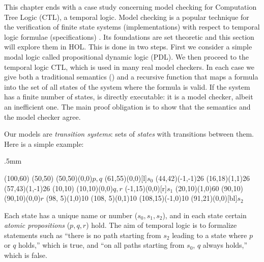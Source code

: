 %
\begin{isabellebody}%
\def\isabellecontext{Base}%
%
\isadelimtheory
%
\endisadelimtheory
%
\isatagtheory
%
\endisatagtheory
{\isafoldtheory}%
%
\isadelimtheory
%
\endisadelimtheory
%
\isamarkuptrue%
%
\begin{isamarkuptext}%
\label{sec:VMC}
This chapter ends with a case study concerning model checking for 
Computation Tree Logic (CTL), a temporal logic.
Model checking is a popular technique for the verification of finite
state systems (implementations) with respect to temporal logic formulae
(specifications) \cite{ClarkeGP-book,Huth-Ryan-book}. Its foundations are set theoretic
and this section will explore them in HOL\@. This is done in two steps.  First
we consider a simple modal logic called propositional dynamic
logic (PDL)\@.  We then proceed to the temporal logic CTL, which is
used in many real
model checkers. In each case we give both a traditional semantics (\isa{{\isasymTurnstile}}) and a
recursive function  that maps a formula into the set of all states of
the system where the formula is valid. If the system has a finite number of
states,  is directly executable: it is a model checker, albeit an
inefficient one. The main proof obligation is to show that the semantics
and the model checker agree.

\underscoreon

Our models are \emph{transition systems}:
sets of \emph{states} with
transitions between them.  Here is a simple example:
\begin{center}
\unitlength.5mm
\thicklines
\begin{picture}(100,60)
\put(50,50){}
\put(50,50){\makebox(0,0){$p,q$}}
\put(61,55){\makebox(0,0)[l]{$s_0$}}
\put(44,42){\vector(-1,-1){26}}
\put(16,18){\vector(1,1){26}}
\put(57,43){\vector(1,-1){26}}
\put(10,10){}
\put(10,10){\makebox(0,0){$q,r$}}
\put(-1,15){\makebox(0,0)[r]{$s_1$}}
\put(20,10){\vector(1,0){60}}
\put(90,10){}
\put(90,10){\makebox(0,0){$r$}}
\put(98, 5){\line(1,0){10}}
\put(108, 5){\line(0,1){10}}
\put(108,15){\vector(-1,0){10}}
\put(91,21){\makebox(0,0)[bl]{$s_2$}}
\end{picture}
\end{center}
Each state has a unique name or number ($s_0,s_1,s_2$), and in each state
certain \emph{atomic propositions} ($p,q,r$) hold.  The aim of temporal logic
is to formalize statements such as ``there is no path starting from $s_2$
leading to a state where $p$ or $q$ holds,'' which is true, and ``on all paths
starting from $s_0$, $q$ always holds,'' which is false.


\end{isamarkuptext}
\end{isabellebody}
